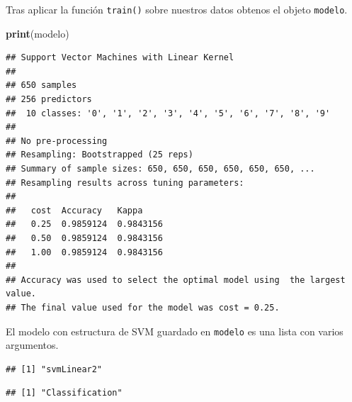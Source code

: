 \documentclass[12pt,spanish,a4paper]{article}
\newenvironment{Shaded}{\begin{snugshade}}{\end{snugshade}}
\newcommand{\KeywordTok}[1]{\textcolor[rgb]{0.13,0.29,0.53}{\textbf{#1}}}
\newcommand{\OperatorTok}[1]{\textcolor[rgb]{0.81,0.36,0.00}{\textbf{#1}}}
\newcommand{\NormalTok}[1]{#1}
\numberwithin{equation}{section}
\begin{document}
Tras aplicar la función \texttt{train()} sobre nuestros datos obtenos el
objeto \texttt{modelo}.

\begin{Shaded}
\begin{Highlighting}[]
\KeywordTok{print}\NormalTok{(modelo)}
\end{Highlighting}
\end{Shaded}

\begin{verbatim}
## Support Vector Machines with Linear Kernel 
## 
## 650 samples
## 256 predictors
##  10 classes: '0', '1', '2', '3', '4', '5', '6', '7', '8', '9' 
## 
## No pre-processing
## Resampling: Bootstrapped (25 reps) 
## Summary of sample sizes: 650, 650, 650, 650, 650, 650, ... 
## Resampling results across tuning parameters:
## 
##   cost  Accuracy   Kappa    
##   0.25  0.9859124  0.9843156
##   0.50  0.9859124  0.9843156
##   1.00  0.9859124  0.9843156
## 
## Accuracy was used to select the optimal model using  the largest value.
## The final value used for the model was cost = 0.25.
\end{verbatim}

El modelo con estructura de SVM guardado en \texttt{modelo} es una lista
con varios argumentos.

\begin{Shaded}
\end{Shaded}

\begin{verbatim}
## [1] "svmLinear2"
\end{verbatim}

\begin{Shaded}
\end{Shaded}

\begin{verbatim}
## [1] "Classification"
\end{verbatim}

\begin{Shaded}
\end{Shaded}
\end{document}
